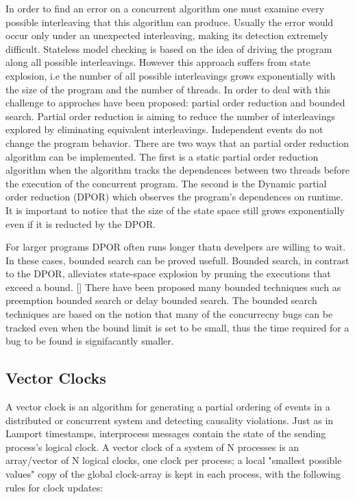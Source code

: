 \documentclass[a4paper,10pt]{article}
\begin{document}
In order to find an error on a concurrent algorithm one must examine every possible interleaving that this algorithm can produce. Usually the error 
would occur only under an unexpected interleaving, making its detection extremely difficult. Stateless model checking is based on the idea of driving 
the program along all possible interleavings. However this approach suffers from state explosion, i.e the number of all possible interleavings grows 
exponentially with the size of the program and the number of threads. In order to deal with this challenge to approches have been proposed: partial order
reduction and bounded search. Partial order reduction is aiming to reduce the number of interleavings explored by eliminating equivalent interleavings.
Independent events do not change the program behavior. There are two ways that an partial order reduction algorithm can be implemented. The first is a
static partial order reduction algorithm when the algorithm tracks the dependences between two threads before the execution of the concurrent program. 
The second is the Dynamic partial order reduction (DPOR) which observes the program's dependences on runtime. It is important to notice that the size of
the state space still grows exponentially even if it is reducted by the DPOR. 

For larger programs DPOR often runs longer thatn develpers are willing to wait. In these cases, bounded search can be proved usefull. Bounded search,
in contrast to the DPOR, alleviates state-space explosion by pruning the executions that exceed a bound. [] There have been proposed many bounded techniques
such as preemption bounded search or delay bounded search. The bounded search techniques are based on the notion that many of the concurrecny bugs can be
tracked even when the bound limit is set to be small, thus the time required for a bug to be found is signifacantly smaller.

\subsection{Vector Clocks}

A vector clock is an algorithm for generating a partial ordering of events in a distributed or concurrent system and detecting causality violations. Just as in Lamport timestamps, interprocess messages contain the state of the sending process's logical clock. A vector clock of a system of N processes is an array/vector of N logical clocks, one clock per process; a local "smallest possible values" copy of the global clock-array is kept in each process, with the following rules for clock updates:
\end{document}
